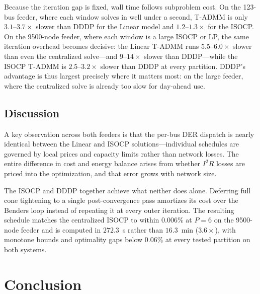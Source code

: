 Because the iteration gap is fixed, wall time follows subproblem cost. On the
123-bus feeder, where each window solves in well under a second, T-ADMM is only
$3.1$--$3.7\times$ slower than DDDP for the Linear model and $1.2$--$1.3\times$
for the ISOCP. On the 9500-node feeder, where each window is a large ISOCP or
LP, the same iteration overhead becomes decisive: the Linear T-ADMM runs
$5.5$--$6.0\times$ slower than even the centralized solve---and $9$--$14\times$
slower than DDDP---while the ISOCP T-ADMM is $2.5$--$3.2\times$ slower than DDDP
at every partition. DDDP's advantage is thus largest precisely where it matters
most: on the large feeder, where the centralized solve is already too slow for
day-ahead use.


\subsection{Discussion}
\label{ssec:disc}

A key observation across both feeders is that the per-bus DER dispatch is nearly
identical between the Linear and ISOCP solutions---individual schedules are
governed by local prices and capacity limits rather than network losses. The
entire difference in cost and energy balance arises from whether $I^2R$ losses
are priced into the optimization, and that error grows with network size.

The ISOCP and DDDP together achieve what neither does alone. Deferring full cone
tightening to a single post-convergence pass amortizes its cost over the Benders
loop instead of repeating it at every outer iteration. The resulting schedule
matches the centralized ISOCP to within $0.006\%$ at $P\!=\!6$ on the 9500-node
feeder and is computed in $272.3$~s rather than $16.3$~min ($3.6\times$), with
monotone bounds and optimality gaps below $0.06\%$ at every tested partition on
both systems.

\section{Conclusion}
\label{sec:conclusion}

